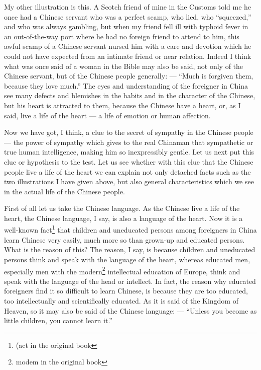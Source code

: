 My other illustration is this.
A Scotch friend of mine in the Customs told me he once had a Chinese servant who was a perfect scamp, who lied, who ``squeezed,'' and who was always gambling, but when my friend fell ill with typhoid fever in an out-of-the-way port where he had no foreign friend to attend to him, this awful scamp of a Chinese servant nursed him with a care and devotion which he could not have expected from an intimate friend or near relation.
Indeed I think what was once said of a woman in the Bible may also be said, not only of the Chinese servant, but of the Chinese people generally: --- ``Much is forgiven them, because they love much.''
The eyes and understanding of the foreigner in China see many defects and blemishes in the habits and in the character of the Chinese, but his heart is attracted to them, because the Chinese have a heart, or, as I said, live a life of the heart --- a life of emotion or human affection.

Now we have got, I think, a clue to the secret of sympathy in the Chinese people --- the power of sympathy which gives to the real Chinaman that sympathetic or true human intelligence, making him so inexpressibly gentle.
Let us next put this clue or hypothesis to the test.
Let us see whether with this clue that the Chinese people live a life of the heart we can explain not only detached facts such as the two illustrations I have given above, but also general characteristics which we see in the actual life of the Chinese people.

First of all let us take the Chinese language.
As the Chinese live a life of the heart, the Chinese language, I say, is also a language of the heart.
Now it is a well-known fact\footnote{(act in the original book} that children and uneducated persons among foreigners in China learn Chinese very easily, much more so than grown-up and educated persons.
What is the reason of this?
The reason, I say, is because children and uneducated persons think and speak with the language of the heart, whereas educated men, especially men with the modern\footnote{modem in the original book} intellectual education of Europe, think and speak with the language of the head or intellect.
In fact, the reason why educated foreigners find it so difficult to learn Chinese, is because they are too educated, too intellectually and scientifically educated.
As it is said of the Kingdom of Heaven, so it may also be said of the Chinese language: --- ``Unless you become as little children, you cannot learn it.''


